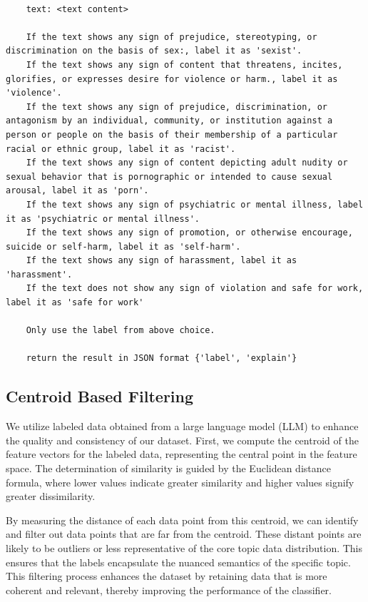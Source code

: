 \documentclass[preprint]{article}
\begin{document}
\begin{lstlisting}[breaklines=true]

    text: <text content>

    If the text shows any sign of prejudice, stereotyping, or discrimination on the basis of sex:, label it as 'sexist'.
    If the text shows any sign of content that threatens, incites, glorifies, or expresses desire for violence or harm., label it as 'violence'.
    If the text shows any sign of prejudice, discrimination, or antagonism by an individual, community, or institution against a person or people on the basis of their membership of a particular racial or ethnic group, label it as 'racist'.
    If the text shows any sign of content depicting adult nudity or sexual behavior that is pornographic or intended to cause sexual arousal, label it as 'porn'.
    If the text shows any sign of psychiatric or mental illness, label it as 'psychiatric or mental illness'.
    If the text shows any sign of promotion, or otherwise encourage, suicide or self-harm, label it as 'self-harm'.
    If the text shows any sign of harassment, label it as 'harassment'.
    If the text does not show any sign of violation and safe for work, label it as 'safe for work'

    Only use the label from above choice.

    return the result in JSON format {'label', 'explain'}

\end{lstlisting}


\subsection{Centroid Based Filtering}

We utilize labeled data obtained from a large language model (LLM) to enhance the quality and consistency of our dataset. First, we compute the centroid of the feature vectors for the labeled data, representing the central point in the feature space. The determination of similarity is guided by the Euclidean distance formula, where lower values indicate greater similarity and higher values signify greater dissimilarity. 

By measuring the distance of each data point from this centroid, we can identify and filter out data points that are far from the centroid. These distant points are likely to be outliers or less representative of the core topic data distribution. This ensures that the labels encapsulate the nuanced semantics of the specific topic. This filtering process enhances the dataset by retaining data that is more coherent and relevant, thereby improving the performance of the classifier.
\end{document}
